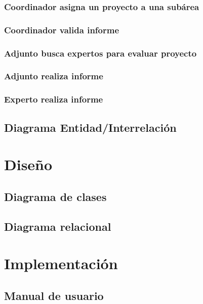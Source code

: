 \documentclass[11pt,a4paper,spanish,twoside]{book}
\begin{document}
\subsection{Coordinador asigna un proyecto a una subárea}

\subsection{Coordinador valida informe}

\subsection{Adjunto busca expertos para evaluar proyecto}

\subsection{Adjunto realiza informe}

\subsection{Experto realiza informe}

\section{Diagrama Entidad/Interrelación}

\chapter{Diseño}

\section{Diagrama de clases}

\section{Diagrama relacional}


\chapter{Implementación}

\section{Manual de usuario}
\end{document}
